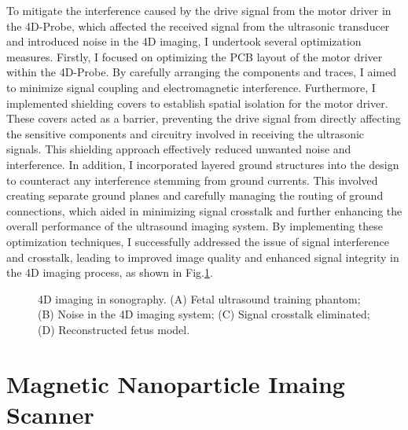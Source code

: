 \documentclass[
    ngerman,american
    ]{scrartcl}
\begin{document}
To mitigate the interference caused by the drive signal from the motor driver in the 4D-Probe, which affected the received signal from the ultrasonic transducer and introduced noise in the 4D imaging, I undertook several optimization measures. Firstly, I focused on optimizing the PCB layout of the motor driver within the 4D-Probe. By carefully arranging the components and traces, I aimed to minimize signal coupling and electromagnetic interference. Furthermore, I implemented shielding covers to establish spatial isolation for the motor driver. These covers acted as a barrier, preventing the drive signal from directly affecting the sensitive components and circuitry involved in receiving the ultrasonic signals. This shielding approach effectively reduced unwanted noise and interference. In addition, I incorporated layered ground structures into the design to counteract any interference stemming from ground currents. This involved creating separate ground planes and carefully managing the routing of ground connections, which aided in minimizing signal crosstalk and further enhancing the overall performance of the ultrasound imaging system. By implementing these optimization techniques, I successfully addressed the issue of signal interference and crosstalk, leading to improved image quality and enhanced signal integrity in the 4D imaging process, as shown in Fig.\ref{4D}.   



\begin{figure}[H]
	
	\caption{4D imaging in sonography. (A) Fetal ultrasound training phantom; (B) Noise in the 4D imaging system; (C) Signal crosstalk eliminated; (D) Reconstructed fetus model.}
	\label{4D}
\end{figure}  







\section{Magnetic Nanoparticle Imaing Scanner}
\end{document}
